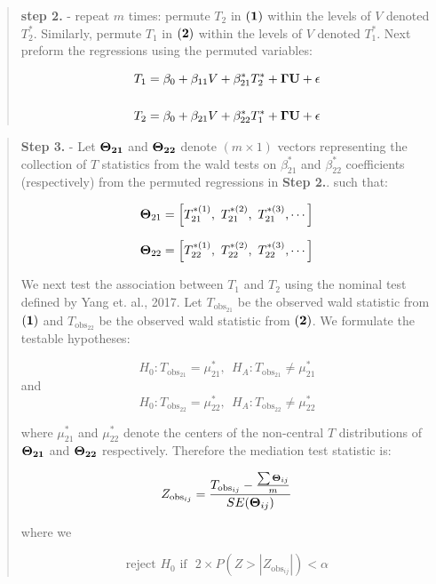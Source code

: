 \documentclass[12pt]{report}
\begin{document}
\begin{quote}
\textbf{step 2.} - repeat $m$ times: permute $T_2$ in $\bf (1)$ within the levels of $V$ denoted $T_2^{\ast}$. Similarly, permute $T_1$ in $\bf (2)$ within the levels of $V$ denoted $T_1^{\ast}$. Next preform the regressions using the permuted variables:

\begin{eqnarray}
T_1 = \beta_0 +\beta_{11}V+\beta_{21}^{\ast}T_2^{\ast}+{\bf \Gamma U}+ \epsilon \\
\nonumber\\
T_2 = \beta_0 +\beta_{21}V+\beta_{22}^{\ast}T_1^{\ast}+{\bf \Gamma U}+ \epsilon \nonumber 
\end{eqnarray}

\end{quote}


\begin{quote}
\textbf{Step 3.} - Let $\bf \Theta_{21}$ and $\bf \Theta_{22}$ denote $(m \times 1)$ vectors representing the collection of $T$ statistics from the wald tests on $\beta_{21}^{\ast}$ and $\beta_{22}^{\ast}$ coefficients (respectively) from the permuted regressions in \textbf{Step 2.}. such that:

\[ {\bf \Theta}_{21} = \left[ T_{21}^{\ast (1)}, \ T_{21}^{\ast (2)}, \ T_{21}^{\ast (3)}, \cdots \right] \]

\[ {\bf \Theta}_{22} = \left[ T_{22}^{\ast (1)}, \ T_{22}^{\ast (2)}, \ T_{22}^{\ast (3)}, \cdots \right]  \]

We next test the association between $T_1$ and $T_2$ using the nominal test defined by Yang et. al., 2017. Let $T_{\text{obs}_{21}}$ be the observed wald statistic from $\bf (1)$ and $T_{\text{obs}_{22}}$ be the observed wald statistic from $\bf(2)$. We formulate the testable hypotheses: 

\[ H_0: T_{\text{obs}_{21}} = \mu_{21}^{\ast}, \ \ H_A: T_{\text{obs}_{21}} \neq \mu_{21}^{\ast} \]
and
\[ H_0: T_{\text{obs}_{22}} = \mu_{22}^{\ast}, \ \ H_A: T_{\text{obs}_{22}} \neq \mu_{22}^{\ast} \]

where $\mu_{21}^{\ast}$ and $\mu_{22}^{\ast}$ denote the centers of the non-central $T$ distributions of $\bf \Theta_{21}$ and $\bf \Theta_{22}$ respectively. Therefore the mediation test statistic is:

\[ Z_{\text{obs}_{ij}} = \frac{T_{\text{obs}_{ij}} - \frac{\sum {\bf \Theta}_{ij}}{m} }{SE({\bf \Theta}_{ij})} \]

where we 

\[ \text{reject $H_0$ if} \ \ \ 2\times P(Z >  |Z_{\text{obs}_{ij}}|) < \alpha \]

\end{quote}
\end{document}
